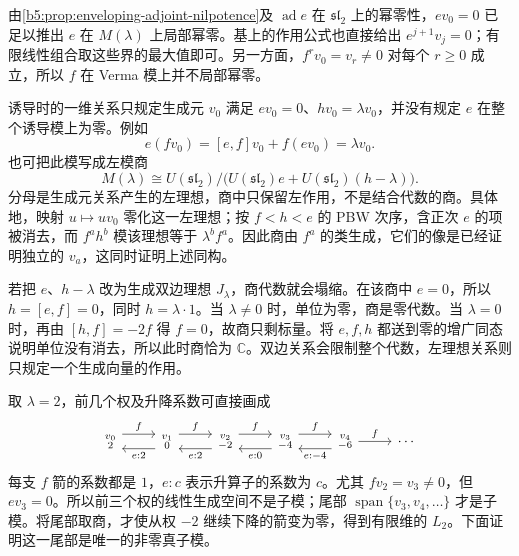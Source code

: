 由\cref{b5:prop:enveloping-adjoint-nilpotence}及 \(\operatorname{ad}e\) 在 \(\mathfrak{sl}_2\) 上的幂零性，\(ev_0=0\) 已足以推出 \(e\) 在 \(M(\lambda)\) 上局部幂零。基上的作用公式也直接给出 \(e^{j+1}v_j=0\)；有限线性组合取这些界的最大值即可。另一方面，\(f^rv_0=v_r\ne0\) 对每个 \(r\ge0\) 成立，所以 \(f\) 在 Verma 模上并不局部幂零。

\ProseParagraphBreak
诱导时的一维关系只规定生成元 \(v_0\) 满足 \(ev_0=0\)、\(hv_0=\lambda v_0\)，并没有规定 \(e\) 在整个诱导模上为零。例如
\[
	e(fv_0)=[e,f]v_0+f(ev_0)=\lambda v_0.
\]
也可把此模写成左模商
\[
	M(\lambda)\cong U(\mathfrak{sl}_2)\big/ \bigl(U(\mathfrak{sl}_2)e+U(\mathfrak{sl}_2)(h-\lambda)\bigr).
\]
分母是生成元关系产生的左理想，商中只保留左作用，不是结合代数的商。具体地，映射 \(u\mapsto uv_0\) 零化这一左理想；按 \(f<h<e\) 的 PBW 次序，含正次 \(e\) 的项被消去，而 \(f^a h^b\) 模该理想等于 \(\lambda^b f^a\)。因此商由 \(f^a\) 的类生成，它们的像是已经证明独立的 \(v_a\)，这同时证明上述同构。

\ProseParagraphBreak

若把 \(e\)、\(h-\lambda\) 改为生成双边理想 \(J_\lambda\)，商代数就会塌缩。在该商中 \(e=0\)，所以 \(h=[e,f]=0\)，同时 \(h=\lambda\cdot1\)。当 \(\lambda\ne0\) 时，单位为零，商是零代数。当 \(\lambda=0\) 时，再由 \([h,f]=-2f\) 得 \(f=0\)，故商只剩标量。将 \(e,f,h\) 都送到零的增广同态说明单位没有消去，所以此时商恰为 \(\mathbb C\)。双边关系会限制整个代数，左理想关系则只规定一个生成向量的作用。

\ProseParagraphBreak

取 \(\lambda=2\)，前几个权及升降系数可直接画成
\[
	\begin{tikzcd}[column sep=2.4em]
		\substack{v_0\\2}\arrow[r,shift left=1.2ex,"f"] &\substack{v_1\\0}\arrow[l,shift left=1.2ex,"e:2"]\arrow[r,shift left=1.2ex,"f"] &\substack{v_2\\-2}\arrow[l,shift left=1.2ex,"e:2"]\arrow[r,shift left=1.2ex,"f"] &\substack{v_3\\-4}\arrow[l,shift left=1.2ex,"e:0"]\arrow[r,shift left=1.2ex,"f"] &\substack{v_4\\-6}\arrow[l,shift left=1.2ex,"e:-4"]\arrow[r,"f"] &\cdots
	\end{tikzcd}
\]
每支 \(f\) 箭的系数都是 \(1\)，\(e:c\) 表示升算子的系数为 \(c\)。尤其 \(fv_2=v_3\ne0\)，但 \(ev_3=0\)。所以前三个权的线性生成空间不是子模；尾部 \(\operatorname{span}\{v_3,v_4,\ldots\}\) 才是子模。将尾部取商，才使从权 \(-2\) 继续下降的箭变为零，得到有限维的 \(L_2\)。下面证明这一尾部是唯一的非零真子模。

